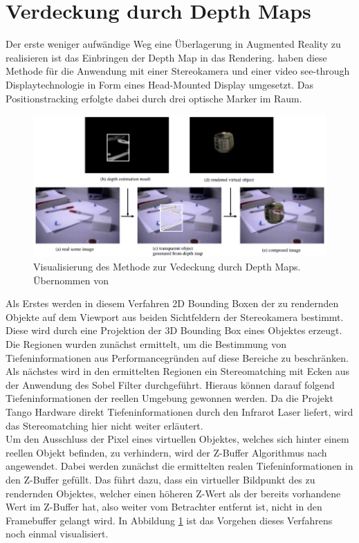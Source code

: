 \section{Verdeckung durch Depth Maps}

Der erste weniger aufwändige Weg eine Überlagerung in Augmented Reality zu realisieren ist das Einbringen der Depth Map in das Rendering. \citet{kanbara2000stereoscopic} haben diese Methode für die Anwendung mit einer Stereokamera und einer video see-through Displaytechnologie in Form eines Head-Mounted Display umgesetzt. Das Positionstracking erfolgte dabei durch drei optische Marker im Raum. \\

\begin{figure}[h]
  \centering
	\includegraphics[width=1.0\textwidth]{content/images/methods/stereo-depth-map.png} 
  \caption{Visualisierung des Methode zur Vedeckung durch Depth Maps. Übernommen von \citet{kanbara2000stereoscopic}}
  \label{fig:stereo-depth-map}
\end{figure}

Als Erstes werden in diesem Verfahren 2D Bounding Boxen der zu rendernden Objekte auf dem Viewport aus beiden Sichtfeldern der Stereokamera bestimmt. Diese wird durch eine Projektion der 3D Bounding Box eines Objektes erzeugt. Die Regionen wurden zunächst ermittelt, um die Bestimmung von Tiefeninformationen aus Performancegründen auf diese Bereiche zu beschränken. Als nächstes wird in den ermittelten Regionen ein Stereomatching mit Ecken aus der Anwendung des Sobel Filter durchgeführt. Hieraus können darauf folgend Tiefeninformationen der reellen Umgebung gewonnen werden. \citep{kanbara2000stereoscopic} Da die Projekt Tango Hardware direkt Tiefeninformationen durch den Infrarot Laser liefert, wird das Stereomatching hier nicht weiter erläutert.   \\

Um den Ausschluss der Pixel eines virtuellen Objektes, welches sich hinter einem reellen Objekt befinden, zu verhindern, wird der Z-Buffer Algorithmus nach \citet{greene1993hierarchical} angewendet. Dabei werden zunächst die ermittelten realen Tiefeninformationen in den Z-Buffer gefüllt. Das führt dazu, dass ein virtueller Bildpunkt des zu rendernden Objektes, welcher einen höheren Z-Wert als der bereits vorhandene Wert im Z-Buffer hat, also weiter vom Betrachter entfernt ist, nicht in den Framebuffer gelangt wird. In Abbildung \ref{fig:stereo-depth-map} ist das Vorgehen dieses Verfahrens noch einmal visualisiert. \\


